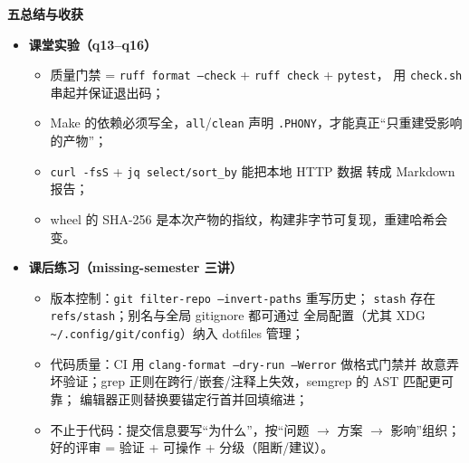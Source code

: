 \documentclass[11pt,a4paper,fontset=none]{ctexart}
\newcommand{\partbanner}[3]{%
  \par\vspace{1.6em}
  \begin{tcolorbox}[enhanced, colback=#1!10, colframe=#1!85!black,
    boxrule=1pt, arc=3pt, left=8pt, right=8pt, top=6pt, bottom=6pt,
    before skip=1.6em]
    {\Large\bfseries\color{#1!70!black}#2\qquad #3}
  \end{tcolorbox}
  \par\vspace{0.2em}\noindent\ignorespaces
}
\begin{document}
\partbanner{expone}{五}{总结与收获}
\begin{itemize}[leftmargin=1.4em, itemsep=2pt]
  \item \textbf{课堂实验（q13--q16）}
  \begin{itemize}[leftmargin=1.6em, itemsep=1pt]
    \item 质量门禁 = \texttt{ruff format --check} + \texttt{ruff check} + \texttt{pytest}，
          用 \texttt{check.sh} 串起并保证退出码；
    \item Make 的依赖必须写全，\texttt{all}/\texttt{clean} 声明
          \texttt{.PHONY}，才能真正“只重建受影响的产物”；
    \item \texttt{curl -fsS} + \texttt{jq select/sort\_by} 能把本地 HTTP 数据
          转成 Markdown 报告；
    \item wheel 的 SHA-256 是本次产物的指纹，构建非字节可复现，重建哈希会变。
  \end{itemize}
  \item \textbf{课后练习（missing-semester 三讲）}
  \begin{itemize}[leftmargin=1.6em, itemsep=1pt]
    \item 版本控制：\texttt{git filter-repo --invert-paths} 重写历史；
          \texttt{stash} 存在 \texttt{refs/stash}；别名与全局 gitignore 都可通过
          全局配置（尤其 XDG \texttt{\textasciitilde/.config/git/config}）纳入 dotfiles 管理；
    \item 代码质量：CI 用 \texttt{clang-format --dry-run --Werror} 做格式门禁并
          故意弄坏验证；grep 正则在跨行/嵌套/注释上失效，semgrep 的 AST 匹配更可靠；
          编辑器正则替换要锚定行首并回填缩进；
    \item 不止于代码：提交信息要写“为什么”，按“问题 $\to$ 方案 $\to$ 影响”组织；
          好的评审 = 验证 + 可操作 + 分级（阻断/建议）。
  \end{itemize}
\end{itemize}
\end{document}

